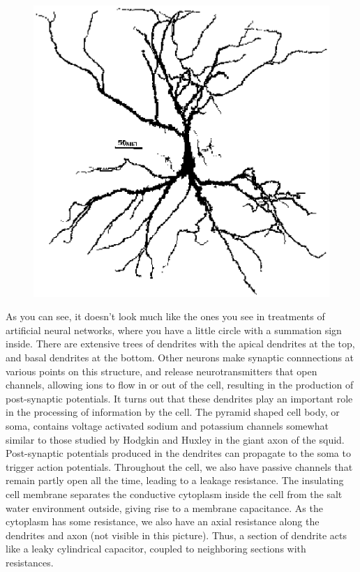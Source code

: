 \documentclass[12pt]{article}
\begin{document}
\begin{figure}[h]
  \centering
 \includegraphics[scale=0.6]{figures/ca3smaller.eps}
  \label{fig:ca3smaller}
\end{figure}

As you can see, it doesn't look much like the ones you see in treatments of artificial neural networks, where you have a little circle with a summation sign inside. There are extensive trees of dendrites with the apical dendrites at the top, and basal dendrites at the bottom. Other neurons make synaptic connnections at various points on this structure, and release neurotransmitters that open channels, allowing ions to flow in or out of the cell, resulting in the production of post-synaptic potentials. It turns out that these dendrites play an important role in the processing of information by the cell. The pyramid shaped cell body, or soma, contains voltage activated sodium and potassium channels somewhat similar to those studied by Hodgkin and Huxley in the giant axon of the squid. Post-synaptic potentials produced in the dendrites can propagate to the soma to trigger action potentials. Throughout the cell, we also have passive channels that remain partly open all the time, leading to a leakage resistance. The insulating cell membrane separates the conductive cytoplasm inside the cell from the salt water environment outside, giving rise to a membrane capacitance. As the cytoplasm has some resistance, we also have an axial resistance along the dendrites and axon (not visible in this picture). Thus, a section of dendrite acts like a leaky cylindrical capacitor, coupled to neighboring sections with resistances.
\end{document}
